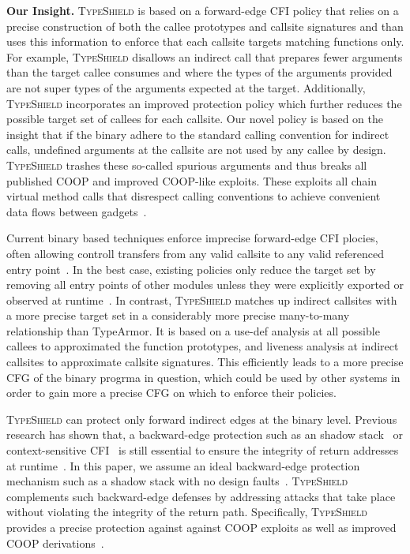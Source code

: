 \textbf{Our Insight.} \textsc{TypeShield} is based on a forward-edge CFI policy that 
relies on a precise construction of both the callee prototypes and callsite signatures
and than uses this information to enforce that each callsite targets matching functions 
only. For example, \textsc{TypeShield} disallows an indirect call that prepares
fewer arguments than the target callee consumes and where the types of the 
arguments provided are not super types of the arguments expected at the target.
Additionally, \textsc{TypeShield} incorporates an improved protection policy
which further reduces the possible target set of callees for each callsite.
Our novel policy is based on the insight that if the binary adhere to the standard calling convention
for indirect calls, undefined arguments at the callsite are not used by
any callee by design. \textsc{TypeShield} trashes these so-called
spurious arguments and thus breaks all published COOP
and improved COOP-like exploits. These exploits all chain
virtual method calls that disrespect calling conventions to
achieve convenient data flows between gadgets~\cite{crane:readactor++}.

Current binary based techniques enforce imprecise forward-edge CFI 
plocies, often allowing controll transfers from any valid callsite 
to any valid referenced entry point~\cite{ccfir:zhang, zhang:usenix}. 
In the best case, existing policies only reduce the target set by
removing all entry points of other modules unless they were
explicitly exported or observed at runtime~\cite{payer:dimva}. 
In contrast, \textsc{TypeShield} matches up indirect callsites with a more precise
target set in a considerably more precise many-to-many relationship than TypeArmor.
It is based on a use-def analysis at all possible callees to approximated the function prototypes, 
and liveness analysis at indirect callsites to approximate callsite signatures. This 
efficiently leads to a more precise CFG of the binary progrma in question, 
which could be used by other systems in order to gain more a precise CFG on which to 
enforce their policies.

\textsc{TypeShield} can protect only forward indirect edges at the binary level.
Previous research has shown that, a backward-edge protection 
such as an shadow stack~\cite{dang:asiaccs} or context-sensitive
CFI~\cite{veen:cfi} is still essential to ensure the integrity of return addresses at 
runtime~\cite{crane:readactor++}. In this paper, we assume an ideal
backward-edge protection mechanism such as a shadow
stack with no design faults~\cite{conti:ccs}. 
\textsc{TypeShield} complements such backward-edge defenses by addressing
attacks that take place without violating the integrity of the return path.
Specifically, \textsc{TypeShield} provides a precise protection 
against against COOP exploits as well as improved COOP 
derivations~\cite{crane:readactor++, subversive-c:lettner, ctf:coop, loop:oriented}.

